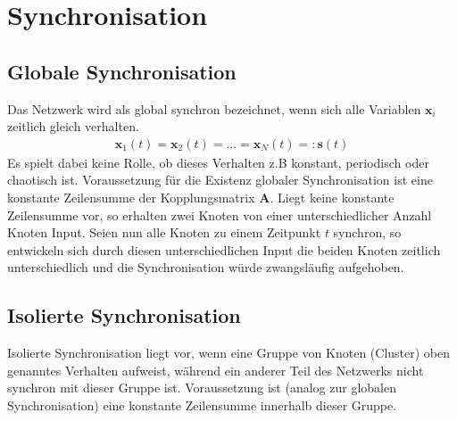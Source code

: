 \section{Synchronisation}
\subsection*{Globale Synchronisation}
Das Netzwerk wird als global synchron bezeichnet, wenn sich alle Variablen $\boldsymbol{x}_i$ zeitlich gleich verhalten.
\begin{align*}
\boldsymbol{x}_1(t)=\boldsymbol{x}_2(t)=...=\boldsymbol{x}_N(t)=:\boldsymbol{s}(t)
\end{align*}
Es spielt dabei keine Rolle, ob dieses Verhalten z.B konstant, periodisch oder chaotisch ist.
Voraussetzung für die Existenz globaler Synchronisation ist eine konstante Zeilensumme der Kopplungsmatrix $\boldsymbol{A}$. Liegt keine konstante Zeilensumme vor, so erhalten zwei Knoten von einer unterschiedlicher Anzahl Knoten Input. Seien nun alle Knoten zu einem Zeitpunkt $t$ synchron, so entwickeln sich durch diesen unterschiedlichen Input die beiden Knoten zeitlich unterschiedlich und die Synchronisation würde zwangsläufig aufgehoben.
\subsection*{Isolierte Synchronisation}
Isolierte Synchronisation liegt vor, wenn eine Gruppe von Knoten (Cluster) oben genanntes Verhalten aufweist, während ein anderer Teil des Netzwerks nicht synchron mit dieser Gruppe ist. Voraussetzung ist (analog zur globalen Synchronisation) eine konstante Zeilensumme innerhalb dieser Gruppe.

